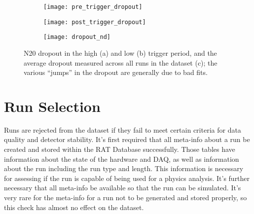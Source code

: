 \begin{figure}[htbp]
    \centering
    \begin{subfigure}[b]{0.48\textwidth}
        \centering
        \texttt{[image: pre\_trigger\_dropout]}
        \caption[]{}
    \end{subfigure}
    \hfill
    \begin{subfigure}[b]{0.48\textwidth}
        \centering
        \texttt{[image: post\_trigger\_dropout]}
        \caption[]{}
    \end{subfigure}

    \begin{subfigure}[b]{0.78\textwidth}
        \centering
        \texttt{[image: dropout\_nd]}
        \caption[]{}
    \end{subfigure}
    \caption[Dropout In Low and High Trigger Period]{
        N20 dropout in the high (a) and low (b) trigger period,
        and the average dropout measured across all runs in the
        dataset (c); the various ``jumps'' in the dropout are generally
        due to bad fits.}
    \label{fig:dataset_dropout}
\end{figure}
%

\section{Run Selection}
\label{sec:run_selection}
Runs are rejected from the dataset if they fail to meet certain criteria
for data quality and detector stability.
It's first required that all meta-info about a run be created and stored
within the RAT Database successfully.
Those tables have information about the state of the hardware and DAQ, as
well as information about the run including the run type and length.
This information is necessary for assessing if the run is capable of being
used for a physics analysis.
It's further necessary that all meta-info be available so that the run
can be simulated.
It's very rare for the meta-info for a run not to be generated and stored
properly, so this check has almost no effect on the dataset.

